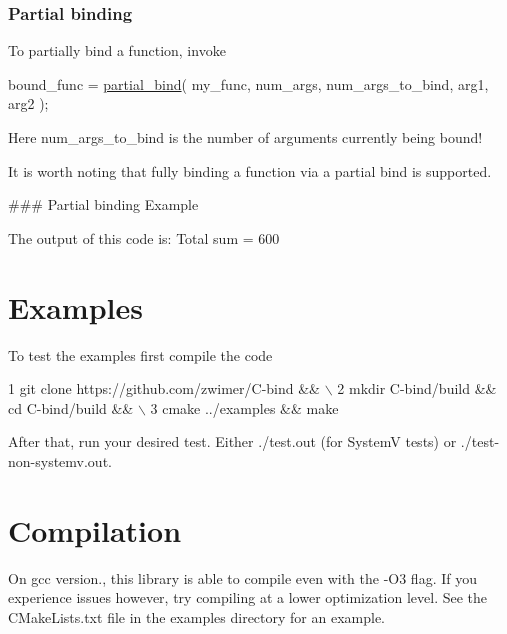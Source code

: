 \subsubsection*{Partial binding}

To partially bind a function, invoke 
\begin{DoxyCode}
bound\_func = \hyperlink{bind_8c_a187e674be73b611c4e8d97345192757a}{partial\_bind}( my\_func, num\_args, num\_args\_to\_bind, arg1, arg2 );
\end{DoxyCode}
 Here {\ttfamily num\+\_\+args\+\_\+to\+\_\+bind} is the number of arguments currently being bound!

It is worth noting that fully binding a function via a partial bind is supported.

\#\#\# Partial binding Example 
 The output of this code is\+: {\ttfamily Total sum = 600} 



\section*{Examples}

To test the examples first compile the code 
\begin{DoxyCode}
1 git clone https://github.com/zwimer/C-bind && \(\backslash\)
2 mkdir C-bind/build && cd C-bind/build && \(\backslash\)
3 cmake ../examples && make
\end{DoxyCode}


After that, run your desired test. Either {\ttfamily ./test.out} (for SystemV tests) or {\ttfamily ./test-\/non-\/systemv.out}.

\section*{Compilation}

On {\ttfamily gcc} version{.}, this library is able to compile even with the {\ttfamily -\/\+O3} flag. If you experience issues however, try compiling at a lower optimization level. See the {\ttfamily C\+Make\+Lists.\+txt} file in the {\ttfamily examples} directory for an example.

